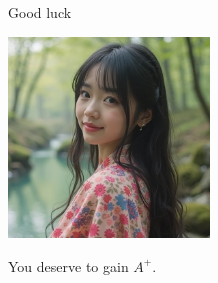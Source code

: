 \documentclass{beamer}
\begin{document}
\begin{frame}{Good luck}
\begin{center}
\includegraphics[width=0.4\textwidth]{good_luck.png}
\end{center}
\begin{center}
You deserve to gain $A^+$.
\end{center}
\end{frame}
\end{document}
